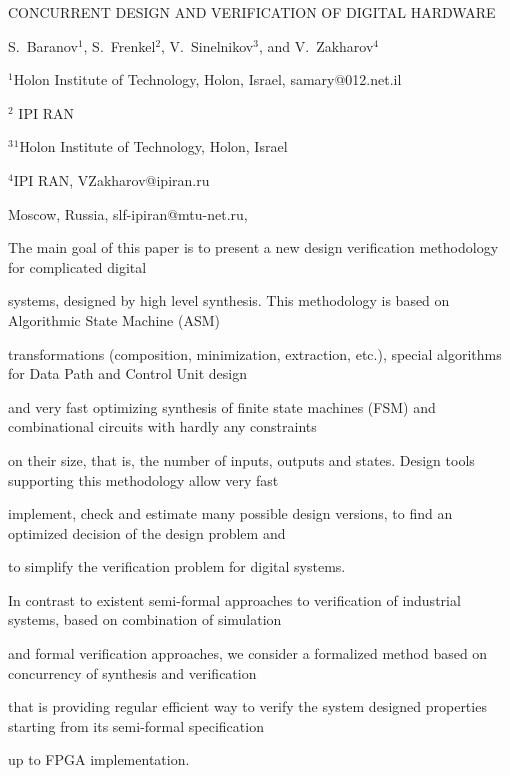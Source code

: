 CONCURRENT DESIGN AND VERIFICATION OF DIGITAL HARDWARE


S.~Baranov$^1$,  S.~Frenkel$^2$, V.~Sinelnikov$^3$, and V.~Zakharov$^4$





    $^1$Holon Institute of Technology, Holon, Israel, samary@012.net.il





                    $^2$  IPI RAN


$^3$$^1$Holon Institute of Technology, Holon, Israel





$^4$IPI RAN,  VZakharov@ipiran.ru


                                     Moscow, Russia, slf-ipiran@mtu-net.ru,








The main goal of this paper is to present a new design verification methodology for complicated digital


systems, designed by high level synthesis. This methodology is based on Algorithmic State Machine (ASM)


transformations (composition, minimization, extraction, etc.), special algorithms for Data Path and Control Unit design


and very fast optimizing synthesis of finite state machines  (FSM) and combinational circuits with hardly any constraints


on their size, that is, the number of inputs, outputs and states. Design tools supporting this methodology allow very fast


implement, check and estimate many possible design versions, to find an optimized decision of the design problem and


to simplify the verification problem for digital systems.


 In contrast to existent semi-formal approaches to verification of industrial systems, based on combination of simulation


and formal verification approaches, we consider a formalized method based on concurrency of synthesis and verification


that is providing regular efficient way to verify the system designed properties starting from its semi-formal specification


up to FPGA implementation.








